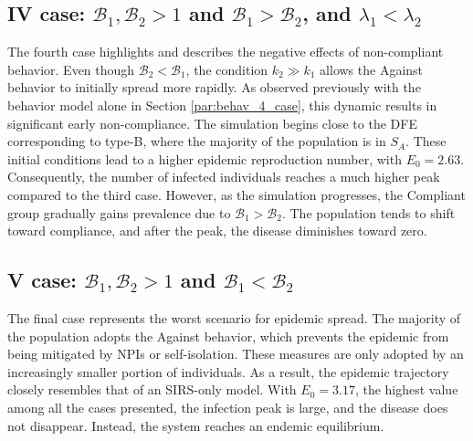 \subsection{IV case:  $\mathcal{B}_1, \mathcal{B}_2 >1$ and $\mathcal{B}_1 >  \mathcal{B}_2$, and $\lambda_1 < \lambda_2$}
The fourth case highlights and describes the negative effects of non-compliant behavior. Even though $\mathcal{B}_2 <\mathcal{B}_1$, the condition $k_2 \gg k_1$ allows the Against behavior to initially spread more rapidly. As observed previously with the behavior model alone in Section \ref{par:behav_4_case}, this dynamic results in significant early non-compliance. The simulation begins close to the DFE corresponding to type-B, where the majority of the population is in $S_A$. These initial conditions lead to a higher epidemic reproduction number, with $E_0 = 2.63$. Consequently, the number of infected individuals reaches a much higher peak compared to the third case.
However, as the simulation progresses, the Compliant group gradually gains prevalence due to $\mathcal{B}_1 >\mathcal{B}_2$. The population tends to shift toward compliance, and after the peak, the disease diminishes toward zero.

\subsection{V case:  $\mathcal{B}_1, \mathcal{B}_2 >1$ and $\mathcal{B}_1 <  \mathcal{B}_2$}
The final case represents the worst scenario for epidemic spread. The majority of the population adopts the Against behavior, which prevents the epidemic from being mitigated by NPIs or self-isolation. These measures are only adopted by an increasingly smaller portion of individuals. As a result, the epidemic trajectory closely resembles that of an SIRS-only model. With $E_0 = 3.17$, the highest value among all the cases presented, the infection peak is large, and the disease does not disappear. Instead, the system reaches an endemic equilibrium.

